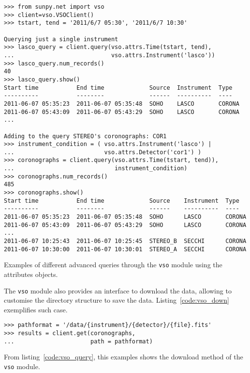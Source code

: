 \begin{listing}[h]
\begin{verbatim}
>>> from sunpy.net import vso
>>> client=vso.VSOClient()
>>> tstart, tend = '2011/6/7 05:30', '2011/6/7 10:30'

Querying just a single instrument
>>> lasco_query = client.query(vso.attrs.Time(tstart, tend), 
...                            vso.attrs.Instrument('lasco'))
>>> lasco_query.num_records()
40
>>> lasco_query.show() 
Start time           End time             Source  Instrument  Type  
----------           --------             ------  ----------  ----  
2011-06-07 05:35:23  2011-06-07 05:35:48  SOHO    LASCO       CORONA
2011-06-07 05:43:09  2011-06-07 05:43:29  SOHO    LASCO       CORONA
...

Adding to the query STEREO's coronographs: COR1
>>> instrument_condition = ( vso.attrs.Instrument('lasco') | 
...                          vso.attrs.Detector('cor1') )
>>> coronographs = client.query(vso.attrs.Time(tstart, tend)), 
...                             instrument_condition)
>>> coronographs.num_records()
485
>>> coronographs.show() 
Start time           End time             Source    Instrument  Type  
----------           --------             ------    ----------  ----  
2011-06-07 05:35:23  2011-06-07 05:35:48  SOHO      LASCO       CORONA
2011-06-07 05:43:09  2011-06-07 05:43:29  SOHO      LASCO       CORONA
...
2011-06-07 10:25:43  2011-06-07 10:25:45  STEREO_B  SECCHI      CORONA
2011-06-07 10:30:00  2011-06-07 10:30:01  STEREO_A  SECCHI      CORONA
\end{verbatim}
\caption{Examples of different advanced queries through the \texttt{vso} 
  module using the attributes objects.}
\label{code:vso_query}
\end{listing}

The \texttt{vso} module also provides an interface to download the data,
allowing to customise the directory structure to save the data.
Listing~\ref{code:vso_down} exemplifies such case.


\begin{listing}[h]
\begin{verbatim}
>>> pathformat = '/data/{instrument}/{detector}/{file}.fits'
>>> results = client.get(coronographs, 
...                      path = pathformat)

\end{verbatim}
\caption{From listing~\ref{code:vso_query}, this examples shows the 
  download method of the \texttt{vso} module.}
\label{code:vso_down}
\end{listing}
